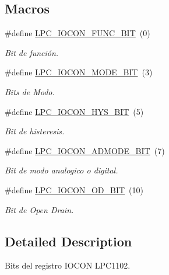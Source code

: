 \subsection*{Macros}
\begin{DoxyCompactItemize}
\item 
\#define \hyperlink{group___l_p_c___i_o_c_o_n___l_p_c1102___b_i_t_s_ga2d9600555b95756df39218dbb47851ae}{L\+P\+C\+\_\+\+I\+O\+C\+O\+N\+\_\+\+F\+U\+N\+C\+\_\+\+B\+IT}~(0)
\begin{DoxyCompactList}\small\item\em Bit de función. \end{DoxyCompactList}\item 
\#define \hyperlink{group___l_p_c___i_o_c_o_n___l_p_c1102___b_i_t_s_ga793b5ab5e1ab4f784e43a86a2d1ff21f}{L\+P\+C\+\_\+\+I\+O\+C\+O\+N\+\_\+\+M\+O\+D\+E\+\_\+\+B\+IT}~(3)
\begin{DoxyCompactList}\small\item\em Bits de Modo. \end{DoxyCompactList}\item 
\#define \hyperlink{group___l_p_c___i_o_c_o_n___l_p_c1102___b_i_t_s_ga4bdb40fca164c65756bd1c3e69207b62}{L\+P\+C\+\_\+\+I\+O\+C\+O\+N\+\_\+\+H\+Y\+S\+\_\+\+B\+IT}~(5)
\begin{DoxyCompactList}\small\item\em Bit de histeresis. \end{DoxyCompactList}\item 
\#define \hyperlink{group___l_p_c___i_o_c_o_n___l_p_c1102___b_i_t_s_ga0ed826952d05716fdcf3252675de3b93}{L\+P\+C\+\_\+\+I\+O\+C\+O\+N\+\_\+\+A\+D\+M\+O\+D\+E\+\_\+\+B\+IT}~(7)
\begin{DoxyCompactList}\small\item\em Bit de modo analogico o digital. \end{DoxyCompactList}\item 
\#define \hyperlink{group___l_p_c___i_o_c_o_n___l_p_c1102___b_i_t_s_ga62a2b807caf0cfa8371cf1df6f5c9a21}{L\+P\+C\+\_\+\+I\+O\+C\+O\+N\+\_\+\+O\+D\+\_\+\+B\+IT}~(10)
\begin{DoxyCompactList}\small\item\em Bit de Open Drain. \end{DoxyCompactList}\end{DoxyCompactItemize}


\subsection{Detailed Description}
Bits del registro I\+O\+C\+ON L\+P\+C1102. 



